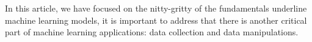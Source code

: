 In this article, we have focused on the nitty-gritty of the fundamentals underline machine learning models, it is important to address that there is another critical part of machine learning applications: data collection and data manipulations.  